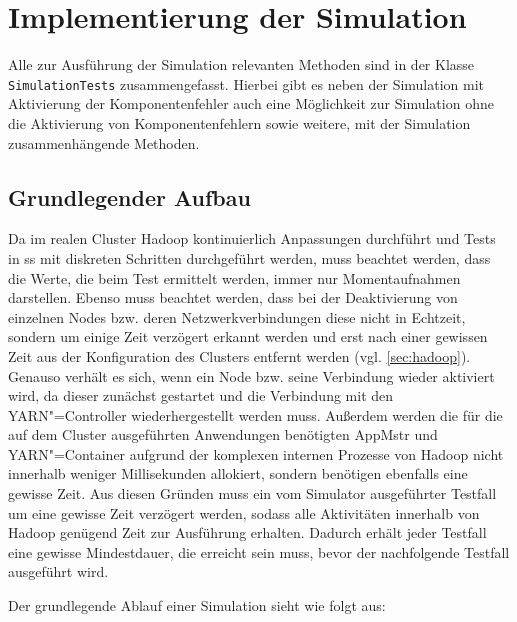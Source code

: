\section{Implementierung der Simulation}
\label{sec:implSimulation}

Alle zur Ausführung der Simulation relevanten Methoden sind in der Klasse \texttt{SimulationTests} zusammengefasst.
Hierbei gibt es neben der Simulation mit Aktivierung der Komponentenfehler auch eine Möglichkeit zur Simulation ohne die Aktivierung von Komponentenfehlern sowie weitere, mit der Simulation zusammenhängende Methoden.

\subsection{Grundlegender Aufbau}
\label{subsec:simulationBasics}

Da im realen Cluster Hadoop kontinuierlich Anpassungen durchführt und Tests in \gls{ss} mit diskreten Schritten durchgeführt werden, muss beachtet werden, dass die Werte, die beim Test ermittelt werden, immer nur Momentaufnahmen darstellen.
Ebenso muss beachtet werden, dass bei der Deaktivierung von einzelnen Nodes bzw. deren Netzwerkverbindungen diese nicht in Echtzeit, sondern um einige Zeit verzögert erkannt werden und erst nach einer gewissen Zeit aus der Konfiguration des Clusters entfernt werden (vgl. \cref{sec:hadoop}).
Genauso verhält es sich, wenn ein Node bzw. seine Verbindung wieder aktiviert wird, da dieser zunächst gestartet und die Verbindung mit den YARN"=Controller wiederhergestellt werden muss.
Außerdem werden die für die auf dem Cluster ausgeführten Anwendungen benötigten \gls{AppMstr} und YARN"=Container aufgrund der komplexen internen Prozesse von Hadoop nicht innerhalb weniger Millisekunden allokiert, sondern benötigen ebenfalls eine gewisse Zeit.
Aus diesen Gründen muss ein vom Simulator ausgeführter Testfall um eine gewisse Zeit verzögert werden, sodass alle Aktivitäten innerhalb von Hadoop genügend Zeit zur Ausführung erhalten.
Dadurch erhält jeder Testfall eine gewisse Mindestdauer, die erreicht sein muss, bevor der nachfolgende Testfall ausgeführt wird.

Der grundlegende Ablauf einer Simulation sieht wie folgt aus:

